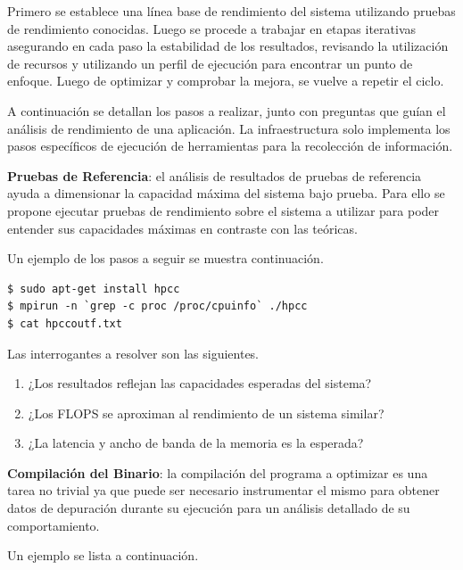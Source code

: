 \documentclass[a4paper]{report}
\begin{document}
Primero se establece una línea base de rendimiento del sistema utilizando pruebas de rendimiento conocidas.
Luego se procede a trabajar en etapas iterativas asegurando en cada paso la estabilidad de los resultados, revisando la utilización de recursos y utilizando un perfil de ejecución para encontrar un punto de enfoque. Luego de optimizar y comprobar la mejora, se vuelve a repetir el ciclo.

\bigskip

A continuación se detallan los pasos a realizar, junto con preguntas que guían el análisis de rendimiento de una aplicación.
La infraestructura solo implementa los pasos específicos de ejecución de herramientas para la recolección de información.

\bigskip

{\bf Pruebas de Referencia}: el análisis de resultados de pruebas de referencia ayuda a dimensionar la capacidad máxima del sistema bajo prueba. Para ello se propone ejecutar pruebas de rendimiento sobre el sistema a utilizar para poder entender sus capacidades máximas en contraste con las teóricas.

\bigskip

Un ejemplo de los pasos a seguir se muestra continuación.

\begin{lstlisting}[caption={Instalación de HPCC},label={lst:hpcc}]
$ sudo apt-get install hpcc
$ mpirun -n `grep -c proc /proc/cpuinfo` ./hpcc
$ cat hpccoutf.txt
\end{lstlisting}

Las interrogantes a resolver son las siguientes.

\begin{enumerate}
\item ¿Los resultados reflejan las capacidades esperadas del sistema?
\item ¿Los FLOPS se aproximan al rendimiento de un sistema similar?
\item ¿La latencia y ancho de banda de la memoria es la esperada?
\end{enumerate}

\bigskip

{\bf Compilación del Binario}: la compilación del programa a optimizar es una tarea no trivial ya que puede ser necesario instrumentar el mismo para obtener datos de depuración durante su ejecución para un análisis detallado de su comportamiento.

\bigskip

Un ejemplo se lista a continuación.
\end{document}

